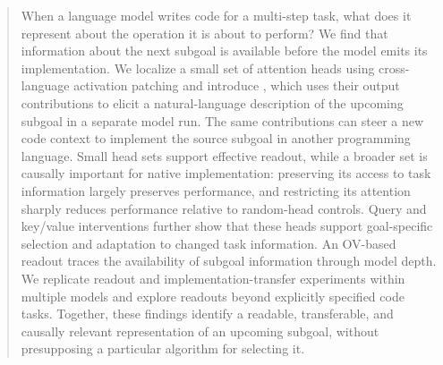 \begin{abstract}
When a language model writes code for a multi-step task, what does it represent about the operation it is about to perform? We find that information about the next subgoal is available before the model emits its implementation. We localize a small set of attention heads using cross-language activation patching and introduce \goalscope, which uses their output contributions to elicit a natural-language description of the upcoming subgoal in a separate model run. The same contributions can steer a new code context to implement the source subgoal in another programming language. Small head sets support effective readout, while a broader set is causally important for native implementation: preserving its access to task information largely preserves performance, and restricting its attention sharply reduces performance relative to random-head controls. Query and key/value interventions further show that these heads support goal-specific selection and adaptation to changed task information. An OV-based readout traces the availability of subgoal information through model depth. We replicate readout and implementation-transfer experiments within multiple models and explore readouts beyond explicitly specified code tasks. Together, these findings identify a readable, transferable, and causally relevant representation of an upcoming subgoal, without presupposing a particular algorithm for selecting it.
\end{abstract}
